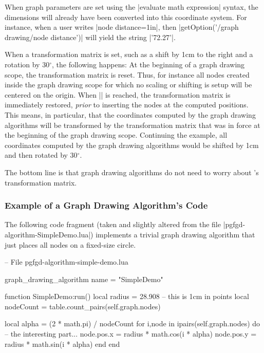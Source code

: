 When graph parameters are set using the |evaluate math expression|
syntax, the dimensions will already have been converted into this
coordinate system. For instance, when a user writes
|node distance=1in|, then |getOption('/graph drawing/node distance')|
will yield the string |'72.27'|.

When a transformation matrix is
set, such as a shift by 1cm to the right and a rotation by
30$^\circ$, the following happens: At the beginning of a
graph drawing scope, the transformation matrix is reset. Thus, for
instance all nodes created inside the graph drawing scope for which no
scaling or shifting is setup will be centered on the origin. When
|\pgfgdendscope| is reached, the transformation matrix is immediately
restored, \emph{prior} to inserting the nodes at the computed
positions. This means, in particular, that the coordinates computed by
the graph drawing algorithms will be transformed by the transformation
matrix that was in force at the beginning of the graph drawing
scope. Continuing the example, all coordinates computed by the graph
drawing algorithms would be shifted by 1cm and then rotated by
30$^\circ$.

The bottom line is that graph drawing algorithms do not need to worry
about \pgfname's transformation matrix.



\subsubsection{Example of a Graph Drawing Algorithm's Code}

The following code fragment (taken and slightly altered
from the file |pgfgd-algorithm-SimpleDemo.lua|)
implements a trivial graph drawing algorithm that just places all
nodes on a fixed-size circle.  



\begin{codeexample}
-- File pgfgd-algorithm-simple-demo.lua
  
graph_drawing_algorithm { name = "SimpleDemo" }

function SimpleDemo:run()
   local radius = 28.908  -- this is 1cm in points
   local nodeCount = table.count_pairs(self.graph.nodes)

   local alpha = (2 * math.pi) / nodeCount
   for i,node in ipairs(self.graph.nodes) do
      -- the interesting part...
      node.pos.x = radius * math.cos(i * alpha)
      node.pos.y = radius * math.sin(i * alpha)
   end
end
\end{codeexample}

